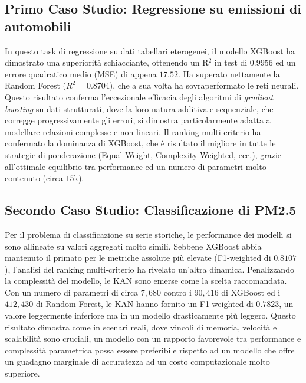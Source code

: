 \documentclass[a4paper,12pt]{report}
\begin{document}
	\subsection*{Primo Caso Studio: Regressione su emissioni di automobili}
	In questo task di regressione su dati tabellari eterogenei, il modello XGBoost ha dimostrato una superiorità schiacciante, ottenendo un R$^2$ in test di $0.9956$ ed un errore quadratico medio (MSE) di appena $17.52$. Ha superato nettamente la Random Forest ($R^2=0.8704$), che a sua volta ha sovraperformato le reti neurali. Questo risultato conferma l'eccezionale efficacia degli algoritmi di \textit{gradient boosting} su dati strutturati, dove la loro natura additiva e sequenziale, che corregge progressivamente gli errori, si dimostra particolarmente adatta a modellare relazioni complesse e non lineari. Il ranking multi-criterio ha confermato la dominanza di XGBoost, che è risultato il migliore in tutte le strategie di ponderazione (Equal Weight, Complexity Weighted, ecc.), grazie all'ottimale equilibrio tra performance ed un numero di parametri molto contenuto (circa $15$k).
	
	\subsection*{Secondo Caso Studio: Classificazione di PM2.5}
	Per il problema di classificazione su serie storiche, le performance dei modelli si sono allineate su valori aggregati molto simili. Sebbene XGBoost abbia mantenuto il primato per le metriche assolute più elevate (F1-weighted di $0.8107$), l'analisi del ranking multi-criterio ha rivelato un'altra dinamica. Penalizzando la complessità del modello, le KAN sono emerse come la scelta raccomandata. Con un numero di parametri di circa $7,680$ contro i $90,416$ di XGBoost ed i $412,430$ di Random Forest, le KAN hanno fornito un F1-weighted di $0.7823$, un valore leggermente inferiore ma in un modello drasticamente più leggero. Questo risultato dimostra come in scenari reali, dove vincoli di memoria, velocità e scalabilità sono cruciali, un modello con un rapporto favorevole tra performance e complessità parametrica possa essere preferibile rispetto ad un modello che offre un guadagno marginale di accuratezza ad un costo computazionale molto superiore.
	
\end{document}
